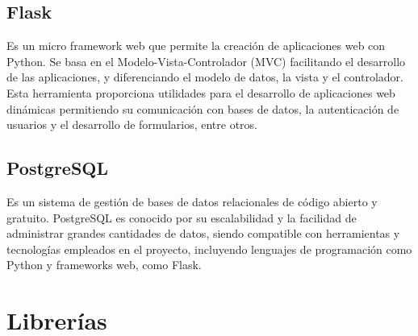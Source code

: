\subsection{Flask}
\cite{Flask_bib} Es un micro framework web que permite la creación de aplicaciones web con Python. Se basa en el Modelo-Vista-Controlador (MVC) facilitando el desarrollo de las aplicaciones, y diferenciando el modelo de datos, la vista y el controlador.
Esta herramienta proporciona utilidades para el desarrollo de aplicaciones web dinámicas permitiendo su comunicación con bases de datos, la autenticación de usuarios y el desarrollo de formularios, entre otros.

\subsection{PostgreSQL} 
\cite{PostgreSQL_bib} Es un sistema de gestión de bases de datos relacionales de código abierto y gratuito.
PostgreSQL es conocido por su escalabilidad y la facilidad de administrar grandes cantidades de datos, siendo compatible con herramientas y tecnologías empleados en el proyecto, incluyendo lenguajes de programación como Python y frameworks web, como Flask.

\section{Librerías}

